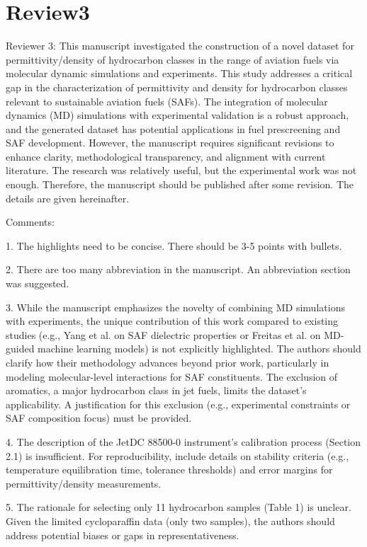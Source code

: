 \documentclass{article}
\begin{document}
\section{Review3}
Reviewer 3: This manuscript investigated the construction of a novel dataset for permittivity/density of hydrocarbon classes in the range of aviation fuels via molecular dynamic simulations and experiments. This study addresses a critical gap in the characterization of permittivity and density for hydrocarbon classes relevant to sustainable aviation fuels (SAFs). The integration of molecular dynamics (MD) simulations with experimental validation is a robust approach, and the generated dataset has potential applications in fuel prescreening and SAF development. However, the manuscript requires significant revisions to enhance clarity, methodological transparency, and alignment with current literature. The research was relatively useful, but the experimental work was not enough. Therefore, the manuscript should be published after some revision. The details are given hereinafter.

Comments:

1. The highlights need to be concise. There should be 3-5 points with bullets.

2. There are too many abbreviation in the manuscript. An abbreviation section was suggested.

3. While the manuscript emphasizes the novelty of combining MD simulations with experiments, the unique contribution of this work compared to existing studies (e.g., Yang et al. on SAF dielectric properties or Freitas et al. on MD-guided machine learning models) is not explicitly highlighted. The authors should clarify how their methodology advances beyond prior work, particularly in modeling molecular-level interactions for SAF constituents. The exclusion of aromatics, a major hydrocarbon class in jet fuels, limits the dataset's applicability. A justification for this exclusion (e.g., experimental constraints or SAF composition focus) must be provided.

4. The description of the JetDC 88500-0 instrument's calibration process (Section 2.1) is insufficient. For reproducibility, include details on stability criteria (e.g., temperature equilibration time, tolerance thresholds) and error margins for permittivity/density measurements.

5. The rationale for selecting only 11 hydrocarbon samples (Table 1) is unclear. Given the limited cycloparaffin data (only two samples), the authors should address potential biases or gaps in representativeness.
\end{document}
